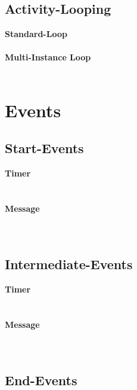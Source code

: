 \subsection{Activity-Looping}

\textbf{Standard-Loop}\\\\

\textbf{Multi-Instance Loop}\\\\


\section{Events}

\subsection{Start-Events}

\textbf{Timer}\\
\\\\

\textbf{Message}\\
\\\\

\subsection{Intermediate-Events}
\textbf{Timer}\\
\\\\

\textbf{Message}\\
\\\\

\subsection{End-Events}
